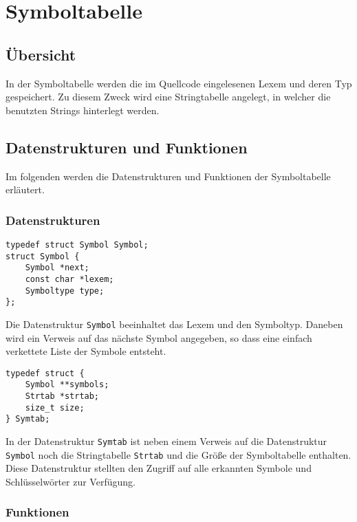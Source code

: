 \chapter{Symboltabelle}
\label{chap:symtab}

\section{Übersicht}
\label{sec:symtab_overview}
In der Symboltabelle werden die im Quellcode eingelesenen Lexem und deren Typ gespeichert. Zu diesem Zweck wird eine Stringtabelle angelegt, in welcher die benutzten Strings hinterlegt werden.

\section{Datenstrukturen und Funktionen}
\label{sec:symtab_datastructure_function}

Im folgenden werden die Datenstrukturen und Funktionen der Symboltabelle erläutert.

\subsection{Datenstrukturen}
\label{sec:symtab_datastructure}

\begin{lstlisting}
typedef struct Symbol Symbol;
struct Symbol {
	Symbol *next;
	const char *lexem;
	Symboltype type;
};
\end{lstlisting}
Die Datenstruktur \texttt{Symbol} beeinhaltet das Lexem und den Symboltyp. Daneben wird ein Verweis auf das nächste Symbol angegeben, so dass eine einfach verkettete Liste der Symbole entsteht.

\begin{lstlisting}
typedef struct {
	Symbol **symbols;
	Strtab *strtab;
	size_t size;
} Symtab;
\end{lstlisting}
In der Datenstruktur \texttt{Symtab} ist neben einem Verweis auf die Datenstruktur \texttt{Symbol}
noch die Stringtabelle \texttt{Strtab} und die Größe der Symboltabelle enthalten. Diese Datenstruktur stellten den Zugriff auf alle erkannten Symbole und Schlüsselwörter zur Verfügung. 

\subsection{Funktionen}
\label{sec:symtab_functions}

